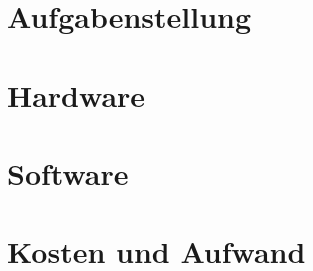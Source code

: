 \documentclass[12pt]{article}
\begin{document}
	\begin{titlepage}
		
	\end{titlepage}
	
	\tableofcontents
	\newpage
	
	\section{Aufgabenstellung}
	

	\section{Hardware}
	
	
	\newpage
	
	\section{Software}
	
	
	\newpage
	
	\section{Kosten und Aufwand}
	
\end{document}
